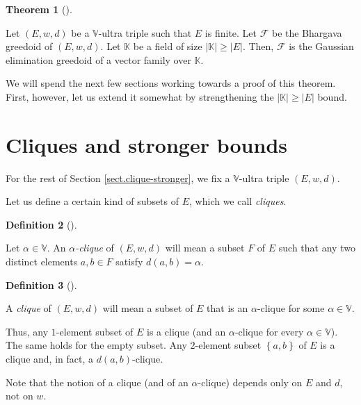 \documentclass[numbers=enddot,12pt,final,onecolumn,notitlepage]{scrartcl}%
\theoremstyle{definition}
\newtheorem{theo}{Theorem}[section]
\newenvironment{theorem}[1][]
{\begin{theo}[#1]\begin{leftbar}}
{\end{leftbar}\end{theo}}
\newtheorem{defi}[theo]{Definition}
\newenvironment{definition}[1][]
{\begin{defi}[#1]\begin{leftbar}}
{\end{leftbar}\end{defi}}
\renewcommand{\geq}{\geqslant}
\theoremstyle{plainsl}
\begin{document}
\begin{theorem}
\label{thm.bh-geg}Let $\left(  E,w,d\right)  $ be a $\mathbb{V}$-ultra triple
such that $E$ is finite. Let $\mathcal{F}$ be the Bhargava greedoid of
$\left(  E,w,d\right)  $. Let $\mathbb{K}$ be a field of size $\left\vert
\mathbb{K}\right\vert \geq\left\vert E\right\vert $. Then, $\mathcal{F}$ is
the Gaussian elimination greedoid of a vector family over $\mathbb{K}$.
\end{theorem}

We will spend the next few sections working towards a proof of this theorem.
First, however, let us extend it somewhat by strengthening the $\left\vert
\mathbb{K}\right\vert \geq\left\vert E\right\vert $ bound.

\section{\label{sect.clique-stronger}Cliques and stronger bounds}

For the rest of Section \ref{sect.clique-stronger}, we fix a $\mathbb{V}%
$-ultra triple $\left(  E,w,d\right)  $.

Let us define a certain kind of subsets of $E$, which we call \textit{cliques}.

\begin{definition}
\label{def.alpha-clique}Let $\alpha\in\mathbb{V}$. An $\alpha$\textit{-clique}
of $\left(  E,w,d\right)  $ will mean a subset $F$ of $E$ such that any two
distinct elements $a,b\in F$ satisfy $d\left(  a,b\right)  =\alpha$.
\end{definition}

\begin{definition}
\label{def.clique}A \textit{clique} of $\left(  E,w,d\right)  $ will mean a
subset of $E$ that is an $\alpha$-clique for some $\alpha\in\mathbb{V}$.
\end{definition}

Thus, any $1$-element subset of $E$ is a clique (and an $\alpha$-clique for
every $\alpha\in\mathbb{V}$). The same holds for the empty subset. Any
$2$-element subset $\left\{  a,b\right\}  $ of $E$ is a clique and, in fact, a
$d\left(  a,b\right)  $-clique.

Note that the notion of a clique (and of an $\alpha$-clique) depends only on
$E$ and $d$, not on $w$.
\end{document}

